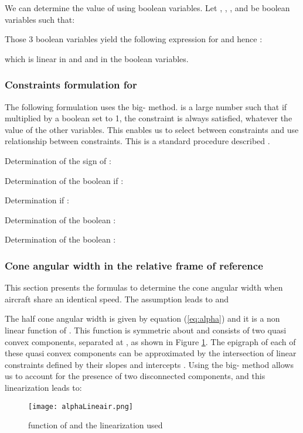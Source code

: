 \documentclass[a4paper, 10pt]{IEEEtran}
\begin{document}
We can determine the value of  using boolean variables. Let , , ,  and  be boolean variables such that:


Those 3 boolean variables yield the following expression for  and hence :


which is linear in  and  and in the boolean variables.





\subsubsection{Constraints formulation for }
The following formulation uses the big- method.  is a large number such that if multiplied by a boolean set to 1, the constraint is always satisfied, whatever the value of the other variables. This enables us to select between constraints and use  relationship between constraints. This is a standard procedure described  \cite{OperationsResearch}.
 
Determination of the sign of  :

Determination of the boolean  if :

Determination if :

Determination of the boolean :

Determination of the boolean :




\subsubsection{Cone angular width  in the relative frame of reference}
This section presents the formulas to determine the cone angular width  when aircraft share an identical speed. The assumption leads to  and



The half cone angular width  is given by equation (\ref{eq:alpha}) and it is a non linear function of .  This function is symmetric about  and consists of two quasi convex components, separated at , as shown in Figure \ref{fig:alphaLinear}. The epigraph of each of these quasi convex components can be approximated by the intersection of linear constraints defined by their
slopes  and intercepts . Using the big- method allows us to account for the presence of two disconnected components, and this linearization leads to:

\begin{figure}[ht]
\centering
    \texttt{[image: alphaLineair.png]}
    \caption{ function of  and the linearization used}
\label{fig:alphaLinear}
\end{figure}
\end{document}
